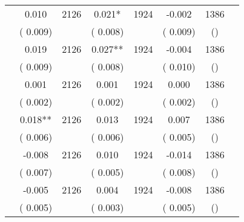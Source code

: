 \begin{tabular}{l*{6}{c}}
        &              0.010      &       2126       &              0.021*      &       1924       &             -0.002      &       1386  &  &              \\
                       &       (       0.009)            &                               &       (       0.008)            &                               &       (       0.009)            &       () &                  \\
        &              0.019      &       2126       &              0.027**      &       1924       &             -0.004      &       1386  &  &              \\
                       &       (       0.009)            &                               &       (       0.008)            &                               &       (       0.010)            &       () &                  \\
        &              0.001      &       2126       &              0.001      &       1924       &              0.000      &       1386  &  &              \\
                       &       (       0.002)            &                               &       (       0.002)            &                               &       (       0.002)            &       () &                  \\
        &              0.018**      &       2126       &              0.013      &       1924       &              0.007      &       1386  &  &              \\
                       &       (       0.006)            &                               &       (       0.006)            &                               &       (       0.005)            &       () &                  \\
        &             -0.008      &       2126       &              0.010      &       1924       &             -0.014      &       1386  &  &              \\
                       &       (       0.007)            &                               &       (       0.005)            &                               &       (       0.008)            &       () &                  \\
        &             -0.005      &       2126       &              0.004      &       1924       &             -0.008      &       1386  &  &              \\
                       &       (       0.005)            &                               &       (       0.003)            &                               &       (       0.005)            &       () &                  \\

\end{tabular}
